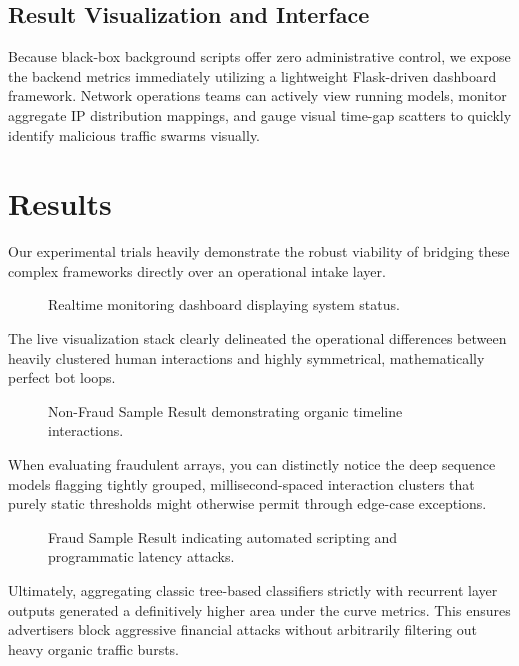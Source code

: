 \documentclass[conference]{IEEEtran}
\begin{document}
\subsection{Result Visualization and Interface}
Because black-box background scripts offer zero administrative control, we expose the backend metrics immediately utilizing a lightweight Flask-driven dashboard framework. Network operations teams can actively view running models, monitor aggregate IP distribution mappings, and gauge visual time-gap scatters to quickly identify malicious traffic swarms visually.

\section{Results}
Our experimental trials heavily demonstrate the robust viability of bridging these complex frameworks directly over an operational intake layer.

\begin{figure}[H]
    \centering
    \vspace{6cm} 
    \caption{Realtime monitoring dashboard displaying system status.}
    \label{fig:realtime}
\end{figure}

The live visualization stack clearly delineated the operational differences between heavily clustered human interactions and highly symmetrical, mathematically perfect bot loops.

\begin{figure}[H]
    \centering
    \vspace{6cm}
    \caption{Non-Fraud Sample Result demonstrating organic timeline interactions.}
    \label{fig:human}
\end{figure}

When evaluating fraudulent arrays, you can distinctly notice the deep sequence models flagging tightly grouped, millisecond-spaced interaction clusters that purely static thresholds might otherwise permit through edge-case exceptions.

\begin{figure}[H]
    \centering
    \vspace{6cm} 
    \caption{Fraud Sample Result indicating automated scripting and programmatic latency attacks.}
    \label{fig:bot}
\end{figure}

Ultimately, aggregating classic tree-based classifiers strictly with recurrent layer outputs generated a definitively higher area under the curve metrics. This ensures advertisers block aggressive financial attacks without arbitrarily filtering out heavy organic traffic bursts.
\end{document}
